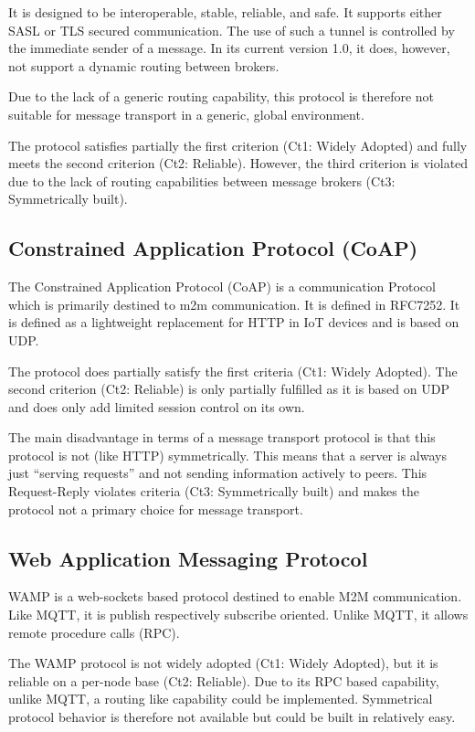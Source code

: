 \documentclass[a4paper,appendixprefix,pdfusetitle,twocolumn,fontsize=8pt,draft,DIV=calc,8pt]{\doctype} %
\begin{document}
It is designed to be interoperable, stable, reliable, and safe. It supports either SASL or TLS secured communication. The use of such a tunnel is controlled by the immediate sender of a message. In its current version 1.0, it does, however, not support a dynamic routing between brokers\cite{amqp}.

Due to the lack of a generic routing capability, this protocol is therefore not suitable for message transport in a generic, global environment.

The protocol satisfies partially the first criterion (Ct1: Widely Adopted) and fully meets the second criterion (Ct2: Reliable). However, the third criterion is violated due to the lack of routing capabilities between message brokers (Ct3: Symmetrically built).

\subsection{Constrained Application Protocol (CoAP)}
The Constrained Application Protocol (CoAP) is a communication Protocol which is primarily destined to m2m communication. It is defined in RFC7252\cite{RFC7252}.  It is defined as a lightweight replacement for HTTP in IoT devices and is based on UDP.

The protocol does partially satisfy the first criteria (Ct1: Widely Adopted). The second criterion (Ct2: Reliable) is only partially fulfilled as it is based on UDP and does only add limited session control on its own.

The main disadvantage in terms of a message transport protocol is that this protocol is not (like HTTP) symmetrically. This means that a server is always just ``serving requests'' and not sending information actively to peers. This Request-Reply violates criteria (Ct3: Symmetrically built) and makes the protocol not a primary choice for message transport. 

\subsection{Web Application Messaging Protocol}
WAMP is a web-sockets based protocol destined to enable M2M communication. Like MQTT, it is publish respectively subscribe oriented. Unlike MQTT, it allows remote procedure calls (RPC).

The WAMP protocol is not widely adopted (Ct1: Widely Adopted), but it is reliable on a per-node base (Ct2: Reliable). Due to its RPC based capability, unlike MQTT, a routing like capability could be implemented. Symmetrical protocol behavior is therefore not available but could be built in relatively easy.
\end{document}
